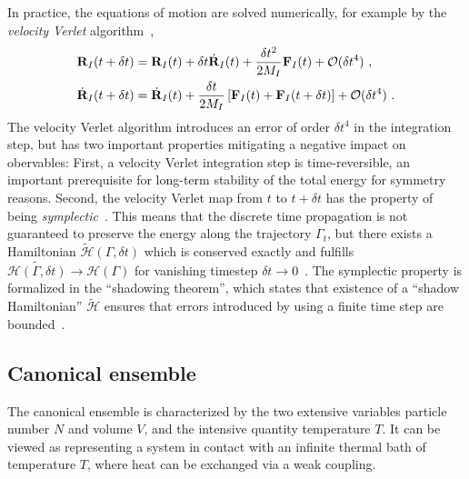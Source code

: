 In practice, the equations of motion are solved numerically, for example by the \emph{velocity Verlet} algorithm~,
\begin{subequations}
\begin{align}
	{\bf R}_I (t + \delta t) 
		&= {\bf R}_I (t) + \delta t \dot{{\bf R}}_I (t) + \frac{\delta t^2}{2 M_I} {\bf F}_I(t) + \mathcal{O} (\delta t^4)~, \\
	\dot{{\bf R}}_I (t + \delta t) 
		&= \dot{{\bf R}}_I (t) + \frac{\delta t}{2 M_I} \left[{\bf F}_I(t) + {\bf F}_I (t + \delta t)\right] + \mathcal{O} (\delta t^4)~.
\end{align}
\label{eq:VelocityVerlet}
\end{subequations}
The velocity Verlet algorithm introduces an error of order $\delta t^4$ in the integration step, but has two important properties mitigating a negative impact on obervables: First, a velocity Verlet integration step is time-reversible, an important prerequisite for long-term stability of the total energy for symmetry reasons. Second, the velocity Verlet map from $t$ to $t + \delta t$ has the property of being \emph{symplectic}~\cite[p.\,101]{Tuckerman}. This means that the discrete time propagation is not guaranteed to preserve the energy along the trajectory $\Gamma_t$, but there exists a Hamiltonian $\tilde{\mathcal H} (\Gamma, \delta t)$ which is conserved exactly and fulfills $\tilde{\mathcal H (\Gamma, \delta t)} \to \mathcal H(\Gamma)$ for vanishing timestep $\delta t \to 0$~\cite[p.\,121]{Tuckerman}. The symplectic property is formalized in the ``shadowing theorem'', which states that existence of a ``shadow Hamiltonian'' $\tilde{\mathcal H}$ ensures that errors introduced by using a finite time step are bounded~.

\subsection{Canonical ensemble}
The canonical ensemble is characterized by the two extensive variables particle number $N$ and volume $V$, and the intensive quantity temperature $T$. It can be viewed as representing a system in contact with an infinite thermal bath of temperature $T$, where heat can be exchanged via a weak coupling.

